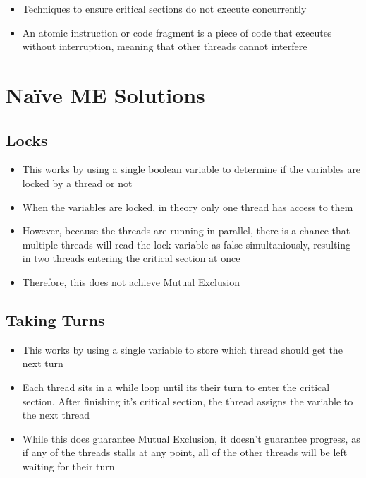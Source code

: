 
\begin{itemize}
  \item Techniques to ensure critical sections do not execute concurrently
  \item An atomic instruction or code fragment is a piece of code that executes without interruption, meaning that other threads cannot interfere
\end{itemize}

\section*{Naïve ME Solutions}

\subsection*{Locks}

\begin{itemize}
  \item This works by using a single boolean variable to determine if the variables are locked by a thread or not
  \item When the variables are locked, in theory only one thread has access to them
  \item However, because the threads are running in parallel, there is a chance that multiple threads will read the lock variable as false simultaniously, resulting in two threads entering the critical section at once
  \item Therefore, this does not achieve Mutual Exclusion
\end{itemize}

\subsection*{Taking Turns}

\begin{itemize}
  \item This works by using a single variable to store which thread should get the next turn
  \item Each thread sits in a while loop until its their turn to enter the critical section. After finishing it's critical section, the thread assigns the variable to the next thread
  \item While this does guarantee Mutual Exclusion, it doesn't guarantee progress, as if any of the threads stalls at any point, all of the other threads will be left waiting for their turn
\end{itemize}

